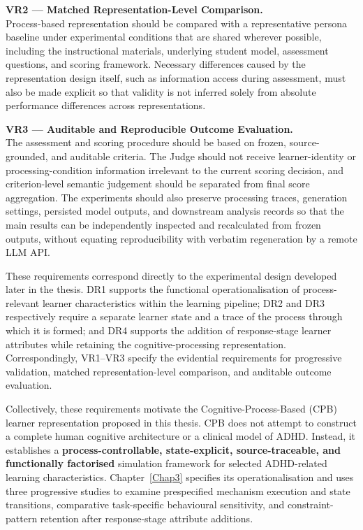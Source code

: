 \textbf{VR2 --- Matched Representation-Level Comparison.}\\
Process-based representation should be compared with a representative persona baseline under experimental conditions that are shared wherever possible, including the instructional materials, underlying student model, assessment questions, and scoring framework. Necessary differences caused by the representation design itself, such as information access during assessment, must also be made explicit so that validity is not inferred solely from absolute performance differences across representations.

\textbf{VR3 --- Auditable and Reproducible Outcome Evaluation.}\\
The assessment and scoring procedure should be based on frozen, source-grounded, and auditable criteria. The Judge should not receive learner-identity or processing-condition information irrelevant to the current scoring decision, and criterion-level semantic judgement should be separated from final score aggregation. The experiments should also preserve processing traces, generation settings, persisted model outputs, and downstream analysis records so that the main results can be independently inspected and recalculated from frozen outputs, without equating reproducibility with verbatim regeneration by a remote LLM API.

These requirements correspond directly to the experimental design developed later in the thesis. DR1 supports the functional operationalisation of process-relevant learner characteristics within the learning pipeline; DR2 and DR3 respectively require a separate learner state and a trace of the process through which it is formed; and DR4 supports the addition of response-stage learner attributes while retaining the cognitive-processing representation. Correspondingly, VR1--VR3 specify the evidential requirements for progressive validation, matched representation-level comparison, and auditable outcome evaluation.

Collectively, these requirements motivate the Cognitive-Process-Based (CPB) learner representation proposed in this thesis. CPB does not attempt to construct a complete human cognitive architecture or a clinical model of ADHD. Instead, it establishes a \textbf{process-controllable, state-explicit, source-traceable, and functionally factorised} simulation framework for selected ADHD-related learning characteristics. Chapter~\ref{Chap3} specifies its operationalisation and uses three progressive studies to examine prespecified mechanism execution and state transitions, comparative task-specific behavioural sensitivity, and constraint-pattern retention after response-stage attribute additions.
